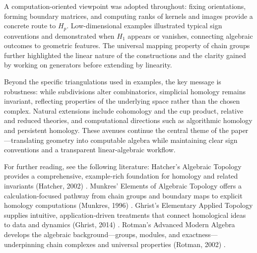 \documentclass[12pt,oneside,reqno]{amsart}
\theoremstyle{plain}
\theoremstyle{definition}
\theoremstyle{remark}
\newcommand{\0}{{\textbf{0}}}
\begin{document}
A computation-oriented viewpoint was adopted throughout: fixing orientations, forming boundary matrices, and computing ranks of kernels and images provide a concrete route to \(H_p\). Low-dimensional examples illustrated typical sign conventions and demonstrated when \(H_1\) appears or vanishes, connecting algebraic outcomes to geometric features. The universal mapping property of chain groups further highlighted the linear nature of the constructions and the clarity gained by working on generators before extending by linearity.

Beyond the specific triangulations used in examples, the key message is robustness: while subdivisions alter combinatorics, simplicial homology remains invariant, reflecting properties of the underlying space rather than the chosen complex. Natural extensions include cohomology and the cup product, relative and reduced theories, and computational directions such as algorithmic homology and persistent homology. These avenues continue the central theme of the paper—translating geometry into computable algebra while maintaining clear sign conventions and a transparent linear-algebraic workflow.

For further reading, see the following literature: Hatcher’s Algebraic Topology provides a comprehensive, example‑rich foundation for homology and related invariants (Hatcher, 2002) \citep{Hatcher2002AlgebraicTopology}. Munkres’ Elements of Algebraic Topology offers a calculation‑focused pathway from chain groups and boundary maps to explicit homology computations (Munkres, 1996) \citep{Munkres1996ElementsAlgebraicTopology}. Ghrist’s Elementary Applied Topology supplies intuitive, application‑driven treatments that connect homological ideas to data and dynamics (Ghrist, 2014) \citep{Ghrist2014ElementaryAppliedTopology}. Rotman’s Advanced Modern Algebra develops the algebraic background—groups, modules, and exactness—underpinning chain complexes and universal properties (Rotman, 2002) \citep{Rotman2002AdvancedModernAlgebra}.



\end{document}
